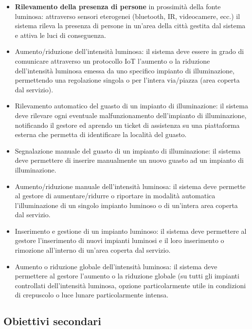 \begin{itemize}
\item
  \textbf{Rilevamento della presenza di persone} in prossimità della
  fonte luminosa: attraverso sensori eterogenei (bluetooth, IR,
  videocamere, ecc.) il sistema rileva la presenza di persone in un'area
  della città gestita dal sistema e attiva le luci di conseguenza.
\item
  Aumento/riduzione dell'intensità luminosa: il sistema deve essere in
  grado di comunicare attraverso un protocollo IoT l'aumento o la
  riduzione dell'intensità luminosa emessa da uno specifico impianto di
  illuminazione, permettendo una regolazione singola o per l'intera
  via/piazza (area coperta dal servizio).
\item
  Rilevamento automatico del guasto di un impianto di illuminazione: il
  sistema deve rilevare ogni eventuale malfunzionamento dell'impianto di
  illuminazione, notificando il gestore ed aprendo un ticket di
  assistenza su una piattaforma esterna che permetta di identificare la
  località del guasto.
\item
  Segnalazione manuale del guasto di un impianto di illuminazione: il
  sistema deve permettere di inserire manualmente un nuovo guasto ad un
  impianto di illuminazione.
\item
  Aumento/riduzione manuale dell'intensità luminosa: il sistema deve
  permette al gestore di aumentare/ridurre o riportare in modalità
  automatica l'illuminazione di un singolo impianto luminoso o di
  un'intera area coperta dal servizio.
\item
  Inserimento e gestione di un impianto luminoso: il sistema deve
  permettere al gestore l'inserimento di nuovi impianti luminosi e il
  loro inserimento o rimozione all'interno di un'area coperta dal
  servizio.
\item
  Aumento o riduzione globale dell'intensità luminosa: il sistema deve
  permettere al gestore l'aumento o la riduzione globale (su tutti gli
  impianti controllati dell'intensità luminosa, opzione particolarmente
  utile in condizioni di crepuscolo o luce lunare particolarmente
  intensa.
\end{itemize}

\hypertarget{obiettivi-secondari}{%
\subsection{Obiettivi secondari}\label{obiettivi-secondari}}

